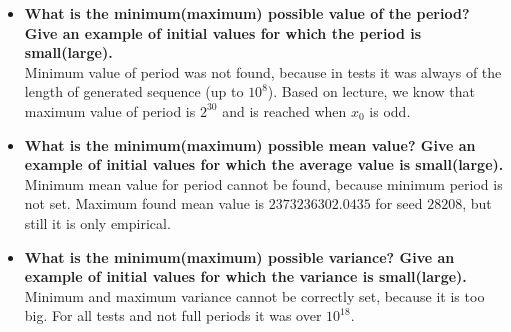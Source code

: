 \documentclass[a4paper,10pt]{article}
\begin{document}
\begin{itemize}
 \item \textbf{What is the minimum(maximum) possible value of the period? Give an example of initial values for which the period is small(large).} \\ 
Minimum value of period was not found, because in tests it was always of the length of generated sequence (up to $10^8$).  Based on lecture, we know that maximum value of period is $2^{30}$ and is reached when $x_0$ is odd.

 \item \textbf{What is the minimum(maximum) possible mean value? Give an example of initial values for which the average value is small(large).} \\
Minimum mean value for period cannot be found, because minimum period is not set. Maximum found mean value is $2373236302.0435$ for seed $28208$, but still it is only empirical.

 \item \textbf{What is the minimum(maximum) possible variance? Give an example of initial values for which the variance is small(large).} \\
Minimum and maximum variance cannot be correctly set, because it is too big. For all tests and not full periods it was over $10^{18}$.


\end{itemize}
\end{document}
